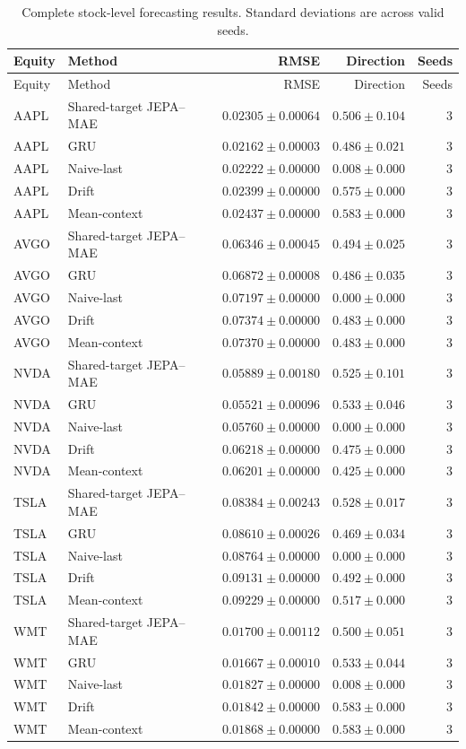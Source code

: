 \begin{longtable}{llrrr}
\caption{Complete stock-level forecasting results. Standard deviations are across valid seeds.}\label{tab:appendix_stock_metrics}\\
\toprule
Equity & Method & RMSE & Direction & Seeds \\
\midrule
\endfirsthead
\toprule
Equity & Method & RMSE & Direction & Seeds \\
\midrule
\endhead
AAPL & Shared-target JEPA--MAE & $0.02305 \pm 0.00064$ & $0.506 \pm 0.104$ & 3 \\
AAPL & GRU & $0.02162 \pm 0.00003$ & $0.486 \pm 0.021$ & 3 \\
AAPL & Naive-last & $0.02222 \pm 0.00000$ & $0.008 \pm 0.000$ & 3 \\
AAPL & Drift & $0.02399 \pm 0.00000$ & $0.575 \pm 0.000$ & 3 \\
AAPL & Mean-context & $0.02437 \pm 0.00000$ & $0.583 \pm 0.000$ & 3 \\
AVGO & Shared-target JEPA--MAE & $0.06346 \pm 0.00045$ & $0.494 \pm 0.025$ & 3 \\
AVGO & GRU & $0.06872 \pm 0.00008$ & $0.486 \pm 0.035$ & 3 \\
AVGO & Naive-last & $0.07197 \pm 0.00000$ & $0.000 \pm 0.000$ & 3 \\
AVGO & Drift & $0.07374 \pm 0.00000$ & $0.483 \pm 0.000$ & 3 \\
AVGO & Mean-context & $0.07370 \pm 0.00000$ & $0.483 \pm 0.000$ & 3 \\
NVDA & Shared-target JEPA--MAE & $0.05889 \pm 0.00180$ & $0.525 \pm 0.101$ & 3 \\
NVDA & GRU & $0.05521 \pm 0.00096$ & $0.533 \pm 0.046$ & 3 \\
NVDA & Naive-last & $0.05760 \pm 0.00000$ & $0.000 \pm 0.000$ & 3 \\
NVDA & Drift & $0.06218 \pm 0.00000$ & $0.475 \pm 0.000$ & 3 \\
NVDA & Mean-context & $0.06201 \pm 0.00000$ & $0.425 \pm 0.000$ & 3 \\
TSLA & Shared-target JEPA--MAE & $0.08384 \pm 0.00243$ & $0.528 \pm 0.017$ & 3 \\
TSLA & GRU & $0.08610 \pm 0.00026$ & $0.469 \pm 0.034$ & 3 \\
TSLA & Naive-last & $0.08764 \pm 0.00000$ & $0.000 \pm 0.000$ & 3 \\
TSLA & Drift & $0.09131 \pm 0.00000$ & $0.492 \pm 0.000$ & 3 \\
TSLA & Mean-context & $0.09229 \pm 0.00000$ & $0.517 \pm 0.000$ & 3 \\
WMT & Shared-target JEPA--MAE & $0.01700 \pm 0.00112$ & $0.500 \pm 0.051$ & 3 \\
WMT & GRU & $0.01667 \pm 0.00010$ & $0.533 \pm 0.044$ & 3 \\
WMT & Naive-last & $0.01827 \pm 0.00000$ & $0.008 \pm 0.000$ & 3 \\
WMT & Drift & $0.01842 \pm 0.00000$ & $0.583 \pm 0.000$ & 3 \\
WMT & Mean-context & $0.01868 \pm 0.00000$ & $0.583 \pm 0.000$ & 3 \\
\bottomrule
\end{longtable}
